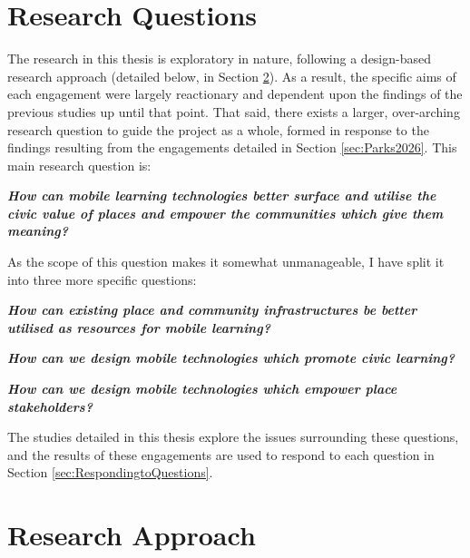 \section{Research Questions}
\label{sec:ResearchQuestions}

The research in this thesis is exploratory in nature, following a design-based research approach (detailed below, in Section \ref{sec:ResearchApproach}). As a result, the specific aims of each engagement were largely reactionary and dependent upon the findings of the previous studies up until that point. That said, there exists a larger, over-arching research question to guide the project as a whole, formed in response to the findings resulting from the engagements detailed in Section \ref{sec:Parks2026}. This main research question is:

\begin{displayquote}
\textit{\textbf{How can mobile learning technologies better surface and utilise the civic value of places and empower the communities which give them meaning?}}
\end{displayquote}

As the scope of this question makes it somewhat unmanageable, I have split it into three more specific questions:

\begin{displayquote}
\textit{\textbf{How can existing place and community infrastructures be better utilised as resources for mobile learning?}}
\end{displayquote}

\begin{displayquote}
\textit{\textbf{How can we design mobile technologies which promote civic learning?}}
\end{displayquote}

\begin{displayquote}
\textit{\textbf{How can we design mobile technologies which empower place stakeholders?}}
\end{displayquote}

The studies detailed in this thesis explore the issues surrounding these questions, and the results of these engagements are used to respond to each question in Section \ref{sec:RespondingtoQuestions}.

\section{Research Approach}
\label{sec:ResearchApproach}

